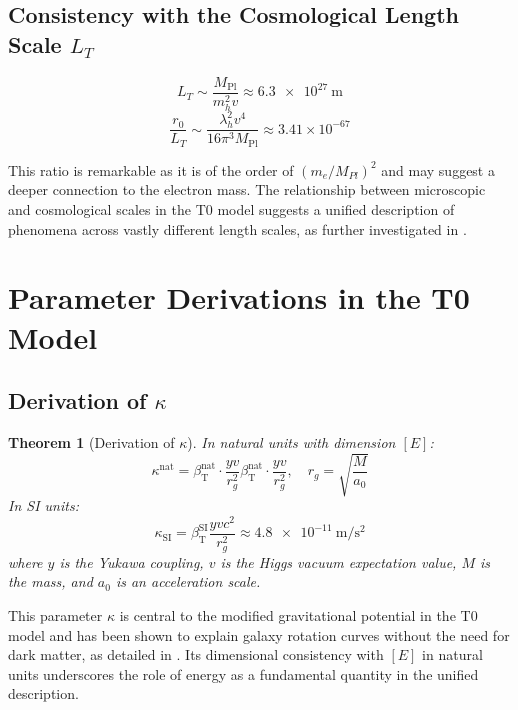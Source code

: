 \documentclass[12pt,a4paper]{article}
\newcommand{\Mpl}{M_{\text{Pl}}}
\newcommand{\betaT}{\beta_{\text{T}}}
\newtheorem{theorem}{Theorem}[section]
\begin{document}
	\subsection{Consistency with the Cosmological Length Scale \(L_T\)}
	\label{subsec:cosmological_scale}
	
	\begin{equation}
		L_T \sim \frac{\Mpl}{m_h^2 v} \approx \SI{6.3e27}{\meter}
	\end{equation}
	\begin{equation}
		\frac{r_0}{L_T} \sim \frac{\lambda_h^2 v^4}{16\pi^3 \Mpl} \approx 3.41 \times 10^{-67}
	\end{equation}
	
	This ratio is remarkable as it is of the order of \((m_e/M_{Pl})^2\) and may suggest a deeper connection to the electron mass. The relationship between microscopic and cosmological scales in the T0 model suggests a unified description of phenomena across vastly different length scales, as further investigated in \cite{pascher_vereinheitlichung_2025}.
	
	\section{Parameter Derivations in the T0 Model}
	\label{sec:parameter_derivations}
	
	\subsection{Derivation of \(\kappa\)}
	\label{subsec:kappa_derivation}
	
	\begin{theorem}[Derivation of \(\kappa\)]
		In natural units with dimension \([E]\):
		\begin{equation}
			\kappa^{\text{nat}} = \betaT^{\text{nat}} \cdot \frac{yv}{r_g^2}\betaT^{\text{nat}} \cdot \frac{yv}{r_g^2}, \quad r_g = \sqrt{\frac{M}{a_0}}
		\end{equation}
		In SI units:
		\begin{equation}
			\kappa_{\text{SI}} = \betaT^{\text{SI}} \frac{y v c^2}{r_g^2} \approx \SI{4.8e-11}{\meter\per\second\squared}
		\end{equation}
		where \(y\) is the Yukawa coupling, \(v\) is the Higgs vacuum expectation value, \(M\) is the mass, and \(a_0\) is an acceleration scale.
	\end{theorem}
	
	This parameter \(\kappa\) is central to the modified gravitational potential in the T0 model and has been shown to explain galaxy rotation curves without the need for dark matter, as detailed in \cite{pascher_galaxies_2025}. Its dimensional consistency with \([E]\) in natural units underscores the role of energy as a fundamental quantity in the unified description.
	
\end{document}
